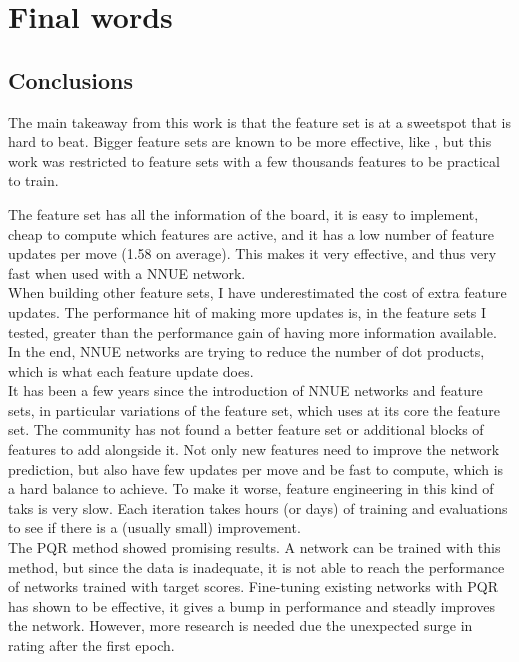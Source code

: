 \section{Final words}
\subsection{Conclusions}


The main takeaway from this work is that the  feature set is at a sweetspot that is hard to beat. Bigger feature sets are known to be more effective, like , but this work was restricted to feature sets with a few thousands features to be practical to train.

The feature set  has all the information of the board, it is easy to implement, cheap to compute which features are active, and it has a low number of feature updates per move (1.58 on average). This makes it very effective, and thus very fast when used with a NNUE network. \\

When building other feature sets, I have underestimated the cost of extra feature updates. The performance hit of making more updates is, in the feature sets I tested, greater than the performance gain of having more information available. In the end, NNUE networks are trying to reduce the number of dot products, which is what each feature update does. \\

It has been a few years since the introduction of NNUE networks and feature sets, in particular variations of the  feature set, which uses at its core the  feature set. 
The community has not found a better feature set or additional blocks of features to add alongside it. Not only new features need to improve the network prediction, but also have few updates per move and be fast to compute, which is a hard balance to achieve.
To make it worse, feature engineering in this kind of taks is very slow. Each iteration takes hours (or days) of training and evaluations to see if there is a (usually small) improvement. \\

The PQR method showed promising results. A network can be trained with this method, but since the data is inadequate, it is not able to reach the performance of networks trained with target scores.
Fine-tuning existing networks with PQR has shown to be effective, it gives a bump in performance and steadly improves the network. However, more research is needed due the unexpected surge in rating after the first epoch.

